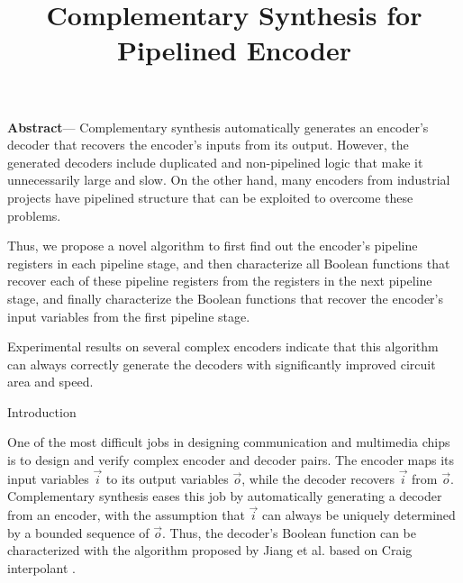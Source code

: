 \documentclass[twocolumn]{article}
\makeatletter
\def\section{\@startsection {section}{1}{\z@}{20pt plus 2pt minus 2pt}
{8pt plus 2pt minus 2pt}{\centering\normalsize\sc
\edef\@svsec{\thesection.\ }}}
\def\thesection{\Roman{section}}
\makeatother
\begin{document}
\date{}

\title{\Large\textbf{Complementary Synthesis for Pipelined Encoder}
}	%


\author{
}
\maketitle
\thispagestyle{empty}

{\small
\textbf{
Abstract}---
Complementary synthesis automatically generates an encoder's decoder
that recovers the encoder's inputs from its output.
However,
the generated decoders  
include duplicated and non-pipelined logic that make it
unnecessarily large and slow.
On the other hand,
many encoders from industrial projects have pipelined structure 
that can be exploited to overcome these problems.

Thus,
we propose a novel algorithm to first find out the encoder's pipeline registers in each pipeline stage,
and then characterize all Boolean functions that recover each of these pipeline registers
from the registers in the next pipeline stage,
and finally characterize the Boolean functions that recover the encoder's input variables 
from the first pipeline stage.

Experimental results on several complex encoders indicate that
this algorithm can always correctly generate the decoders with significantly
improved circuit area and speed.
}

\section{Introduction}

One of the most difficult jobs in designing communication
and multimedia chips is to design and verify complex encoder and decoder pairs.
The encoder maps its input variables $\vec{i}$ to its output variables $\vec{o}$,
while the decoder recovers $\vec{i}$ from $\vec{o}$.
Complementary synthesis 
\cite{ShenICCAD09,ShenTCAD10,ShenTCAD11,ShenTCAD12,LiuICCAD11,LiuTCAD12,TuDAC13}
eases this job by
automatically generating a decoder from an encoder,
with the assumption that $\vec{i}$ can always be
uniquely determined by a bounded sequence of $\vec{o}$.
Thus,
the decoder's Boolean function can be characterized
with the algorithm proposed by Jiang et al. \cite{InterpBoolFunction}
based on Craig interpolant \cite{Craig}.
\end{document}
